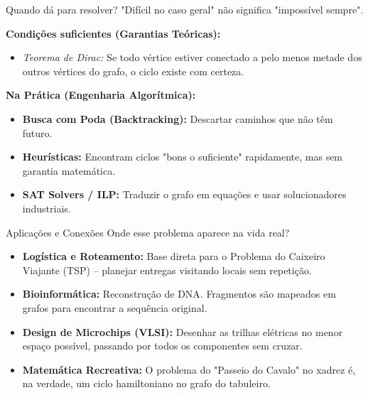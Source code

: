 \documentclass[10pt, aspectratio=169]{beamer}
\begin{document}
\begin{frame}{Quando dá para resolver?}
    "Difícil no caso geral" não significa "impossível sempre".
    
    \vspace{1em}
    \textbf{Condições suficientes (Garantias Teóricas):}
    \begin{itemize}
        \item \textit{Teorema de Dirac:} Se todo vértice estiver conectado a pelo menos metade dos outros vértices do grafo, o ciclo existe com certeza.
    \end{itemize}
    
    \vspace{1em}
    \textbf{Na Prática (Engenharia Algorítmica):}
    \begin{itemize}
        \item \textbf{Busca com Poda (Backtracking):} Descartar caminhos que não têm futuro.
        \item \textbf{Heurísticas:} Encontram ciclos "bons o suficiente" rapidamente, mas sem garantia matemática.
        \item \textbf{SAT Solvers / ILP:} Traduzir o grafo em equações e usar solucionadores industriais.
    \end{itemize}
\end{frame}

\begin{frame}{Aplicações e Conexões}
    Onde esse problema aparece na vida real?
    
    \vspace{1em}
    \begin{itemize}
        \item \textbf{Logística e Roteamento:} Base direta para o Problema do Caixeiro Viajante (TSP) -- planejar entregas visitando locais sem repetição.
        \item \textbf{Bioinformática:} Reconstrução de DNA. Fragmentos são mapeados em grafos para encontrar a sequência original.
        \item \textbf{Design de Microchips (VLSI):} Desenhar as trilhas elétricas no menor espaço possível, passando por todos os componentes sem cruzar.
        \item \textbf{Matemática Recreativa:} O problema do "Passeio do Cavalo" no xadrez é, na verdade, um ciclo hamiltoniano no grafo do tabuleiro.
    \end{itemize}
\end{frame}
\end{document}
